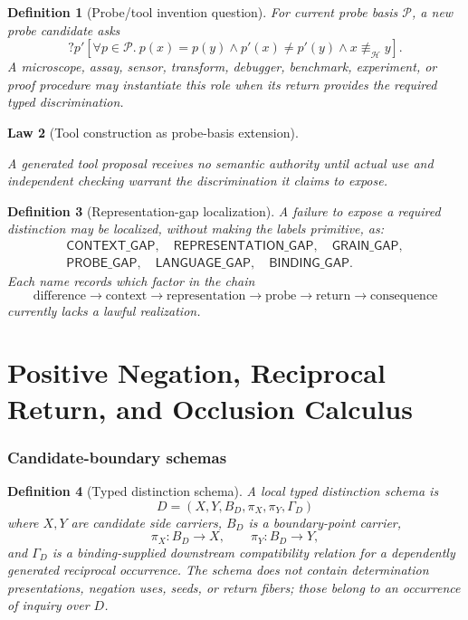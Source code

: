 \documentclass[11pt,oneside]{article}
\newtheorem{definition}{Definition}[section]
\newtheorem{law}[definition]{Law}
\begin{document}
\begin{definition}[Probe/tool invention question]
For current probe basis \(\mathcal P\), a new probe candidate asks
\[
\boxed{
?p'[
\forall p\in\mathcal P.\ p(x)=p(y)
\land
p'(x)\neq p'(y)
\land
x\not\equiv_{\mathcal H}y
].
}
\]
A microscope, assay, sensor, transform, debugger, benchmark, experiment, or proof procedure may instantiate this role when its return provides the required typed discrimination.
\end{definition}

\begin{law}[Tool construction as probe-basis extension]
\begin{center}
\end{center}
A generated tool proposal receives no semantic authority until actual use and independent checking warrant the discrimination it claims to expose.
\end{law}

\begin{definition}[Representation-gap localization]
A failure to expose a required distinction may be localized, without making the labels primitive, as:
\[
\begin{gathered}
\mathsf{CONTEXT\_GAP},\quad
\mathsf{REPRESENTATION\_GAP},\quad
\mathsf{GRAIN\_GAP},\\
\mathsf{PROBE\_GAP},\quad
\mathsf{LANGUAGE\_GAP},\quad
\mathsf{BINDING\_GAP}.
\end{gathered}
\]
Each name records which factor in the chain
\[
\text{difference}\to\text{context}\to\text{representation}\to\text{probe}\to\text{return}\to\text{consequence}
\]
currently lacks a lawful realization.
\end{definition}

\part{Positive Negation, Reciprocal Return, and Occlusion Calculus}

\section{Candidate-boundary schemas}

\begin{definition}[Typed distinction schema]\label{def:distinction-schema}
A local typed distinction schema is
\[
\boxed{D=(X,Y,B_D,\pi_X,\pi_Y,\Gamma_D)}
\]
where \(X,Y\) are candidate side carriers, \(B_D\) is a boundary-point carrier,
\[
\pi_X:B_D\to X,
\qquad
\pi_Y:B_D\to Y,
\]
and \(\Gamma_D\) is a binding-supplied downstream compatibility relation for a dependently generated reciprocal occurrence.  The schema does not contain determination presentations, negation uses, seeds, or return fibers; those belong to an occurrence of inquiry over \(D\).
\end{definition}
\end{document}
